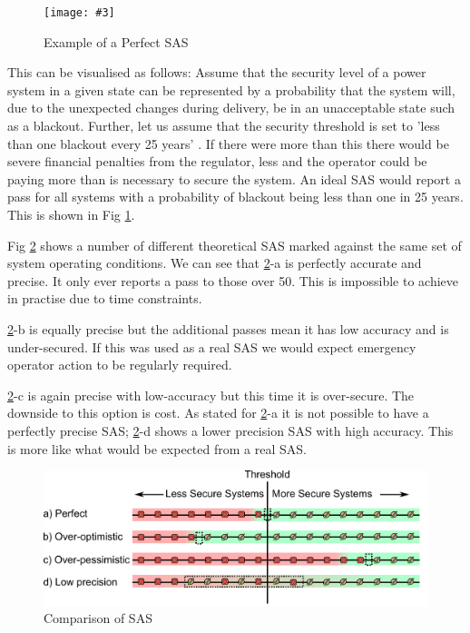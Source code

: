 \documentclass[a4paper,oneside,12pt]{report}
\newcommand{\image}[3] {
  \begin{figure}
    \begin{center}
      \texttt{[image: \#3]}
      \caption{#2}
      \label{#1}
    \end{center}
  \end{figure}
}
\newenvironment{vivacorrections}
{}
{}
\begin{document}
\image{perfectSAS}{Example of a Perfect SAS}{perfectsas.png}

\begin{vivacorrections}

This can be visualised as follows: Assume that the security level of a power system in a given state can be represented by a probability that the system will, due to the unexpected changes during delivery, be in an unacceptable state such as a blackout. Further, let us assume that the security threshold is set to 'less than one blackout every 25 years' . If there were more than this there would be severe financial penalties from the regulator, less and the operator could be paying more than is necessary to secure the system. An ideal SAS would report a pass for all systems with a probability of blackout being less than one in 25 years. This is shown in Fig \ref{perfectSAS}.

\end{vivacorrections}

Fig \ref{SAScomparison} shows a number of different theoretical SAS marked against the same set of system operating conditions. We can see that \ref{SAScomparison}-a is perfectly accurate and precise. It only ever reports a pass to those over 50. This is impossible to achieve in practise due to time constraints.

\ref{SAScomparison}-b is equally precise but the additional passes mean it has low accuracy and is under-secured.  If this was used as a real SAS we would expect emergency operator action to be regularly required.

\ref{SAScomparison}-c is again precise with low-accuracy but this time it is over-secure. The downside to this option is cost. As stated for \ref{SAScomparison}-a it is not possible to have a perfectly precise SAS; \ref{SAScomparison}-d shows a lower precision SAS with high accuracy. This is more like what would be expected from a real SAS.


  \begin{figure}
    \begin{center}
      \includegraphics[scale=0.7]{sascomparison.png}
      \caption{Comparison of SAS}
      \label{SAScomparison}
    \end{center}
  \end{figure}
\end{document}
